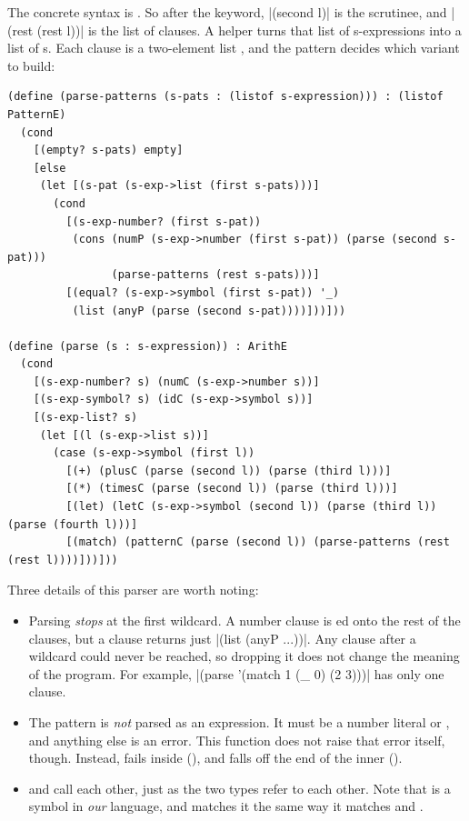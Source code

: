 The concrete syntax is . So after the  keyword, \rkt|(second l)| is the scrutinee, and \rkt|(rest (rest l))| is the list of clauses. A helper turns that list of s-expressions into a list of s. Each clause is a two-element list , and the pattern decides which variant to build:
\begin{lstlisting}
(define (parse-patterns (s-pats : (listof s-expression))) : (listof PatternE)
  (cond
    [(empty? s-pats) empty]
    [else
     (let [(s-pat (s-exp->list (first s-pats)))]
       (cond
         [(s-exp-number? (first s-pat))
          (cons (numP (s-exp->number (first s-pat)) (parse (second s-pat)))
                (parse-patterns (rest s-pats)))]
         [(equal? (s-exp->symbol (first s-pat)) '_)
          (list (anyP (parse (second s-pat))))]))]))

(define (parse (s : s-expression)) : ArithE
  (cond
    [(s-exp-number? s) (numC (s-exp->number s))]
    [(s-exp-symbol? s) (idC (s-exp->symbol s))]
    [(s-exp-list? s)
     (let [(l (s-exp->list s))]
       (case (s-exp->symbol (first l))
         [(+) (plusC (parse (second l)) (parse (third l)))]
         [(*) (timesC (parse (second l)) (parse (third l)))]
         [(let) (letC (s-exp->symbol (second l)) (parse (third l)) (parse (fourth l)))]
         [(match) (patternC (parse (second l)) (parse-patterns (rest (rest l))))]))]))
\end{lstlisting}
Three details of this parser are worth noting:
\begin{itemize}
  \item Parsing \emph{stops} at the first wildcard. A number clause is ed onto the rest of the clauses, but a \code{\_} clause returns just \rkt|(list (anyP ...))|. Any clause after a wildcard could never be reached, so dropping it does not change the meaning of the program. For example, \rkt|(parse '(match 1 (_ 0) (2 3)))| has only one clause.
  \item The pattern is \emph{not} parsed as an expression. It must be a number literal or \code{\_}, and anything else is an error. This function does not raise that error itself, though. Instead,  fails inside  (), and  falls off the end of the inner  ().
  \item {} and  call each other, just as the two types refer to each other. Note that  is a symbol in \emph{our} language, and  matches it the same way it matches \code{+} and .
\end{itemize}

